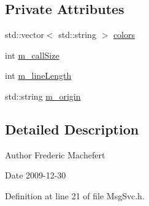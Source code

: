 \subsection*{Private Attributes}
\begin{DoxyCompactItemize}
\item 
std::vector$<$ std::string $>$ \hyperlink{classMsgSvc_abcd0a0eab83f97f7638bbcca4f69e950}{colors}
\item 
int \hyperlink{classMsgSvc_ab22aa5d8130cbb94246c4192440d41fb}{m\_\-callSize}
\item 
int \hyperlink{classMsgSvc_a63c500a8e8573e6e68e0c2966920ddaa}{m\_\-lineLength}
\item 
std::string \hyperlink{classMsgSvc_a2bf08fec17ae56486896dc6934528442}{m\_\-origin}
\end{DoxyCompactItemize}


\subsection{Detailed Description}
\begin{DoxyAuthor}{Author}
Frederic Machefert 
\end{DoxyAuthor}
\begin{DoxyDate}{Date}
2009-\/12-\/30 
\end{DoxyDate}


Definition at line 21 of file MsgSvc.h.

